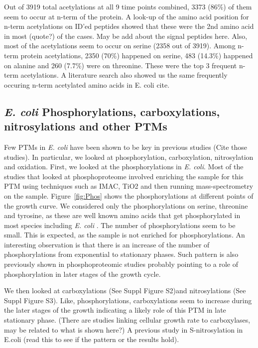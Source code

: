\documentclass[12pt]{article}
\begin{document}
Out of 3919 total acetylations at all 9 time points combined, 3373 (86\%) of them seem to occur at n-term of the protein. A look-up of the amino acid position for n-term acetylations on ID'ed peptides showed that these were the 2nd amino acid in most (quote?) of the cases. {May be add about the signal peptides here}. Also, most of the acetylations seem to occur on serine (2358 out of 3919). Among n-term protein acetylations, 2350 (70\%) happened on serine, 483 (14.3\%) happened on alanine and 260 (7.7\%) were on threonine. These were the top 3 frequent n-term acetylations. A literature search also showed us the same frequently occuring n-term acetylated amino acids in E. coli {cite}.


\subsection{\emph{E. coli} Phosphorylations, carboxylations, nitrosylations and other PTMs}

Few PTMs in \emph{E. coli} have been shown to be key in previous studies (Cite those studies). In particular, we looked at phosphorylation, carboxylation, nitrosylation and oxidation. First, we looked at the phosphorylations in \emph{E. coli}. Most of the studies that looked at phosphoproteome involved enriching the sample for this PTM using techniques such as IMAC, TiO2 and then running mass-spectrometry on the sample. Figure~\ref{fig:Phos} shows the phosphorylations at different points of the growth curve. We considered only the phosphorylations on serine, threonine and tyrosine, as these are well known amino acids that get phosphorylated in most species including \emph{E. coli} \cite{Maceketal2008}. The number of phosphorylations seem to be small. This is expected, as the sample is not enriched for phosphorylations. An interesting observation is that there is an increase of the number of phosphorylations from exponential to stationary phases. Such pattern is also previously shown in phosphoproteomic studies \cite{Soaresetal2013} probably pointing to a role of phosphorylation in later stages of the growth cycle.

We then looked at carboxylations (See Suppl Figure S2)and nitrosylations (See Suppl Figure S3). Like, phosphorylations, carboxylations seem to increase during the later stages of the growth indicating a likely role of this PTM in late stationary phase. (There are studies linking cellular growth rate to carboxylases, may be related to what is shown here?) A previous study in S-nitrosylation in E.coli \cite{Sethetal2012} (read this to see if the pattern or the results hold). 
\end{document}
